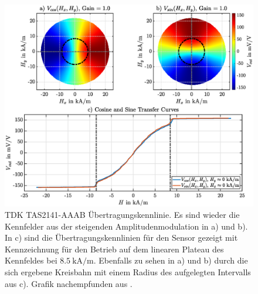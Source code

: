 	
	\clearpage
	\begin{figure}[tbph]
		\centering
		\includegraphics[width=\linewidth]{chapters/images/TDK_Uebertragungskennlinien}
		\caption[TDK TAS2141-AAAB Übertragungskennlinie]{TDK TAS2141-AAAB Übertragungskennlinie. Es sind wieder die 
		Kennfelder aus der steigenden Amplitudenmodulation in a) und b). In c) sind die Übertragungskennlinien für den 
		Sensor gezeigt mit Kennzeichnung für den Betrieb auf dem linearen Plateau des Kennfeldes bei 
		$\SI{8.5}{\kilo\ampere\per\metre}$. Ebenfalls zu sehen in a) und b) durch die sich ergebene Kreisbahn mit einem 
		Radius des aufgelegten Intervalls aus c). Grafik nachempfunden aus \cite{Schuethe2019}.}
		\label{fig:TDKuebertragungskennlinien}
	\end{figure}

